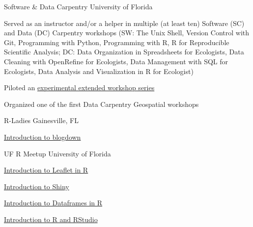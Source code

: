 \begin{cventries}

\cventry
    {Software \& Data Carpentry} %
    {} %
    {} %
    {University of Florida} %
    {
      \begin{cvitems} %
        \item {Served as an instructor and/or a helper in multiple (at least ten) Software (SC) and  Data (DC) Carpentry workshops (SW: The Unix Shell, Version Control with Git, Programming with Python, Programming with R, R for Reproducible Scientific Analysis; DC: Data Organization in Spreadsheets for Ecologists, Data Cleaning with OpenRefine for Ecologists, Data Management with SQL for Ecologists, Data Analysis and Visualization in R for Ecologist)}
        \item {Piloted an \href{https://datacarpentry.org/blog/2018/04/dc-seven-weeks}{experimental extended workshop series}}
        \item {Organized one of the first Data Carpentry Geospatial workshops}
      \end{cvitems}
    }

\cventry
    {R-Ladies} %
    {} %
    {} %
    {Gainesville, FL} %
    {
      \begin{cvitems} %
        \item {\href{https://www.justinmillar.com/r-ladies-blogdown.html}{Introduction to blogdown}}
      \end{cvitems}
    }

\cventry
    {UF R Meetup} %
    {} %
    {} %
    {University of Florida} %
    {
      \begin{cvitems} %
        \item {\href{https://justinmillar.github.io/leaflet-intro/}{Introduction to Leaflet in R}}
        \item {\href{http://www.r-gators.com/2018/03/28/introduction-to-shiny/}{Introduction to Shiny}}
        \item {\href{http://www.r-gators.com/2017/09/06/introduction-to-dataframes-in-r/}{Introduction to Dataframes in R}}
        \item {\href{http://www.r-gators.com/2017/08/30/introduction-to-r-and-rstudio/}{Introduction to R and RStudio}}
      \end{cvitems}
    }



\end{cventries}
